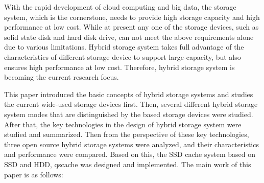 \begin{englishabstract}

With the rapid development of cloud computing and big data, the storage system, which is the cornerstone, needs to provide high storage capacity and high performance at low cost. While at present any one of the storage devices, such as solid state disk and hard disk drive, can not meet the above requirements alone due to various limitations. Hybrid storage system takes full advantage of the characteristics of different storage device to support large-capacity, but also ensures high performance at low cost. Therefore, hybrid storage system is becoming the current research focus. 

This paper introduced the basic concepts of hybrid storage systems and studies the current wide-used storage devices first. Then, several different hybrid storage system modes that are distinguished by the based storage devices were studied. After that, the key technologies in the design of hybrid storage system were studied and summarized. Then from the perspective of these key technologies, three open source hybrid storage systems were analyzed, and their characteristics and performance were compared. Based on this, the SSD cache system based on SSD and HDD, qscache was designed and implemented. The main work of this paper is as follows:



\end{englishabstract}
